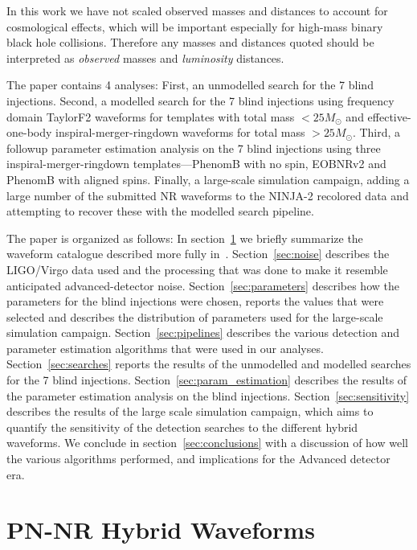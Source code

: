 In this work we have not scaled observed masses and distances to account for 
cosmological effects, which will be important especially for high-mass binary 
black hole collisions. Therefore any masses and distances quoted should be 
interpreted as \emph{observed} masses and \emph{luminosity} distances.

The paper contains 4 analyses: First, an unmodelled search for the 7 blind 
injections. Second, a modelled search for the 7 blind injections using 
frequency domain TaylorF2 waveforms for templates with total mass $<25 
M_{\odot}$ and effective-one-body inspiral-merger-ringdown waveforms for total 
mass $>25 M_{\odot}$. Third, a followup parameter estimation analysis on the 7 
blind injections using three inspiral-merger-ringdown templates---PhenomB with 
no spin, EOBNRv2 and PhenomB with aligned spins. Finally, a large-scale 
simulation campaign, adding a large number of the submitted NR waveforms 
to the 
NINJA-2 recolored data and attempting to recover these with the modelled 
search pipeline. 

The paper is organized as follows:
In section~\ref{sec:waveforms} we briefly summarize the waveform
catalogue described more fully in~\cite{Ajith:2012az}.
Section~\ref{sec:noise} describes the LIGO/Virgo data used and the
processing that was done to make it resemble anticipated
advanced-detector noise.  Section~\ref{sec:parameters} describes how
the parameters for the blind injections were chosen, reports the values 
that were selected and describes the distribution of parameters used for the 
large-scale simulation campaign.
Section~\ref{sec:pipelines} describes the various detection and parameter 
estimation algorithms that were used in our analyses.
Section~\ref{sec:searches} reports the results of the unmodelled and modelled 
searches for the 7 blind injections.  Section~\ref{sec:param_estimation} 
describes the results of the parameter estimation analysis on the blind 
injections. 
Section~\ref{sec:sensitivity} describes the results of 
the large scale simulation campaign, which aims to quantify the sensitivity 
of the detection searches to the different hybrid waveforms. We conclude in 
section~\ref{sec:conclusions} with a discussion of 
how well the various algorithms performed, and implications for the
Advanced detector era.


\section{PN-NR Hybrid Waveforms}
\label{sec:waveforms}

